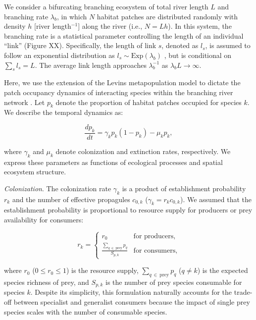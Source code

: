 \documentclass[11pt, class=article, crop=false]{standalone}
\begin{document}
We consider a bifurcating branching ecosystem of total river length $L$ and branching rate $\lambda_b$, in which $N$ habitat patches are distributed randomly with density $h$ [river length$^{-1}$] along the river (i.e., $N = Lh$).
In this system, the branching rate is a statistical parameter controlling the length of an individual ``link'' (Figure XX).
Specifically, the length of link $s$, denoted as $l_s$, is assumed to follow an exponential distribution as $l_s \sim \mbox{Exp}(\lambda_b)$ \citep{peckham_reformulation_1999, terui_metapopulation_2018, terui_emergent_2021}, but is conditional on $\sum_s l_s = L$.
The average link length approaches $\lambda_b^{-1}$ as $\lambda_b L \rightarrow \infty$.

Here, we use the extension of the Levins metapopulation model to dictate the patch occupancy dynamics of interacting species within the branching river network \citep{calcagno_constraints_2011, takimoto_effects_2012, guo_towards_2023}.
Let $p_k$ denote the proportion of habitat patches occupied for species $k$.
We describe the temporal dynamics as:

\begin{equation}
    \frac{dp_k}{dt} = \gamma_{k} p_k (1 - p_k) - \mu_k p_k,
\end{equation}

where $\gamma_k$ and $\mu_k$ denote colonization and extinction rates, respectively.
We express these parameters as functions of ecological processes and spatial ecosystem structure.

\textit{Colonization}. The colonization rate $\gamma_k$ is a product of establishment probability $r_k$ and the number of effective propagules $c_{0,k}$ ($\gamma_k = r_k c_{0,k}$).
We assumed that the establishment probability is proportional to resource supply for producers or prey availability for consumers:

\begin{equation}
    r_{k} = 
    \begin{cases}
        r_0 & \text{for producers,}\\
        \frac{\sum_{q~\in~\text{prey}} p_{q}}{S_{p,k}} & \text{for consumers,}
    \end{cases}
\end{equation}

where $r_0$ ($0 \le r_0 \le 1$) is the resource supply, $\sum_{q~\in~\text{prey}} p_{q}$ ($q \ne k$) is the expected species richness of prey, and $S_{p,k}$ is the number of prey species consumable for species $k$.
Despite its simplicity, this formulation naturally accounts for the trade-off between specialist and generalist consumers because the impact of single prey species scales with the number of consumable species.
\end{document}
